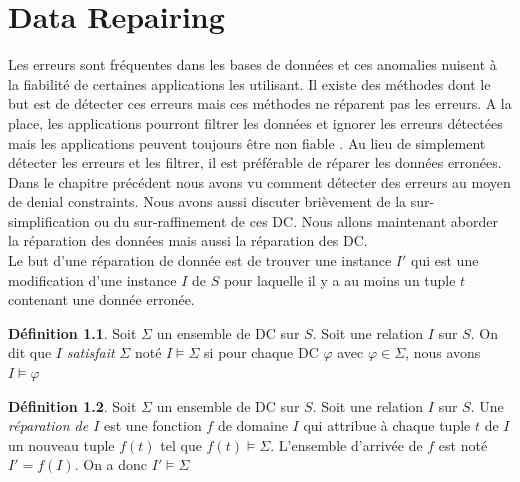 \documentclass[letterpaper, 12pt]{report}
\theoremstyle{definition}
\newtheorem{mydef}{Définition}
\begin{document}
\chapter{Data Repairing}

Les erreurs sont fréquentes dans les bases de données et ces anomalies nuisent à la fiabilité de certaines applications les utilisant. Il existe des méthodes dont le but est de détecter ces erreurs mais ces méthodes ne réparent pas les erreurs. A la place, les applications pourront filtrer les données et ignorer les erreurs détectées mais les applications peuvent toujours être non fiable \cite{anodetect}. Au lieu de simplement détecter les erreurs et les filtrer, il est préférable de réparer les données erronées.\\

Dans le chapitre précédent nous avons vu comment détecter des erreurs au moyen de denial constraints. Nous avons aussi discuter brièvement de la sur-simplification ou du sur-raffinement de ces DC. Nous allons maintenant aborder la réparation des données mais aussi la réparation des DC.\\

%

Le but d'une réparation de donnée est de trouver une instance $I'$ qui est une modification d'une instance $I$ de $S$ pour laquelle il y a au moins un tuple $t$ contenant une donnée erronée.\\

\begin{mydef}
	Soit $\Sigma$ un ensemble de DC sur $S$. Soit une relation $I$ sur $S$. On dit que $I$ \emph{satisfait} $\Sigma$ noté $I \models \Sigma$ si pour chaque DC $\varphi$ avec $\varphi \in \Sigma$, nous avons $I \models \varphi$
\end{mydef}

\begin{mydef}
	Soit $\Sigma$ un ensemble de DC sur $S$. Soit une relation $I$ sur $S$. Une \emph{réparation de $I$} est une fonction $f$ de domaine $I$ qui attribue à chaque tuple $t$ de $I$ un nouveau tuple $f(t)$ tel que $f(t) \models \Sigma$. L'ensemble d'arrivée de $f$ est noté $I'=f(I)$. On a donc $I' \models \Sigma$
\end{mydef}
\end{document}
